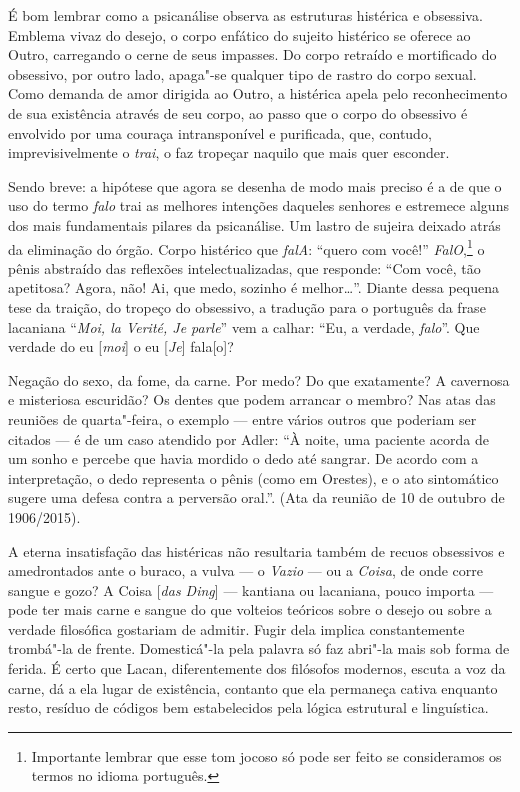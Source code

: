 É bom lembrar como a psicanálise observa as estruturas histérica e
obsessiva. Emblema vivaz do desejo, o corpo enfático do sujeito
histérico se oferece ao Outro, carregando o cerne de seus impasses. Do
corpo retraído e mortificado do obsessivo, por outro lado, apaga"-se
qualquer tipo de rastro do corpo sexual. Como demanda de amor dirigida
ao Outro, a histérica apela pelo reconhecimento de sua existência
através de seu corpo, ao passo que o corpo do obsessivo é envolvido por
uma couraça intransponível e purificada, que, contudo, imprevisivelmente
o \emph{trai}, o faz tropeçar naquilo que mais quer esconder.

Sendo breve: a hipótese que agora se desenha de modo mais preciso é a de
que o uso do termo \emph{falo} trai as melhores intenções daqueles
senhores e estremece alguns dos mais fundamentais pilares da
psicanálise. Um lastro de sujeira deixado atrás da eliminação do órgão.
Corpo histérico que \emph{falA}: ``quero com você!''
\emph{FalO},\footnote{Importante lembrar que esse tom jocoso só pode ser
  feito se consideramos os termos no idioma português.} o pênis
abstraído das reflexões intelectualizadas, que responde: ``Com você, tão
apetitosa? Agora, não! Ai, que medo, sozinho é melhor\ldots{}''. Diante dessa
pequena tese da traição, do tropeço do obsessivo, a tradução para o
português da frase lacaniana ``\emph{Moi, la Verité, Je parle}'' vem a
calhar: ``Eu, a verdade, \emph{falo}''. Que verdade do eu
{[}\emph{moi}{]} o eu {[}\emph{Je}{]} fala{[}o{]}?

Negação do sexo, da fome, da carne. Por medo? Do que exatamente? A
cavernosa e misteriosa escuridão? Os dentes que podem arrancar o membro?
Nas atas das reuniões de quarta"-feira, o exemplo --- entre vários outros
que poderiam ser citados --- é de um caso atendido por Adler: ``À noite,
uma paciente acorda de um sonho e percebe que havia mordido o dedo até
sangrar. De acordo com a interpretação, o dedo representa o pênis (como
em Orestes), e o ato sintomático sugere uma defesa contra a perversão
oral.''. (Ata da reunião de 10 de outubro de 1906/2015).

A eterna insatisfação das histéricas não resultaria também de recuos
obsessivos e amedrontados ante o buraco, a vulva --- o \emph{Vazio} --- ou
a \emph{Coisa}, de onde corre sangue e gozo? A Coisa {[}\emph{das
Ding}{]} --- kantiana ou lacaniana, pouco importa --- pode ter mais carne
e sangue do que volteios teóricos sobre o desejo ou sobre a verdade
filosófica gostariam de admitir. Fugir dela implica constantemente
trombá"-la de frente. Domesticá"-la pela palavra só faz abri"-la mais sob
forma de ferida. É certo que Lacan, diferentemente dos filósofos
modernos, escuta a voz da carne, dá a ela lugar de existência, contanto
que ela permaneça cativa enquanto resto, resíduo de códigos bem
estabelecidos pela lógica estrutural e linguística.

